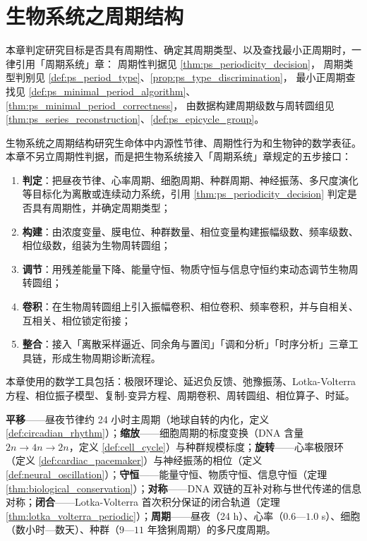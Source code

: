 \chapter{生物系统之周期结构}

\begin{remark}[本章目标的周期性判定（引用）]\label{rem:bio_ps_hook}
本章判定研究目标是否具有周期性、确定其周期类型、以及查找最小正周期时，一律引用「周期系统」章：
周期性判据见 \cref{thm:ps_periodicity_decision}，
周期类型判别见 \cref{def:ps_period_type}、\cref{prop:ps_type_discrimination}，
最小正周期查找见 \cref{def:ps_minimal_period_algorithm}、\cref{thm:ps_minimal_period_correctness}，
由数据构建周期级数与周转圆组见 \cref{thm:ps_series_reconstruction}、\cref{def:ps_epicycle_group}。
\end{remark}

\begin{remark}\label{rem:bio_five_steps_positioning}
生物系统之周期结构研究生命体中内源性节律、周期性行为和生物钟的数学表征。本章不另立周期性判据，而是把生物系统接入「周期系统」章规定的五步接口：
\begin{enumerate}[label=(\arabic*)]
    \item \textbf{判定}：把昼夜节律、心率周期、细胞周期、种群周期、神经振荡、多尺度演化等目标化为离散或连续动力系统，引用 \cref{thm:ps_periodicity_decision} 判定是否具有周期性，并确定周期类型；
    \item \textbf{构建}：由浓度变量、膜电位、种群数量、相位变量构建振幅级数、频率级数、相位级数，组装为生物周转圆组；
    \item \textbf{调节}：用残差能量下降、能量守恒、物质守恒与信息守恒约束动态调节生物周转圆组；
    \item \textbf{卷积}：在生物周转圆组上引入振幅卷积、相位卷积、频率卷积，并与自相关、互相关、相位锁定衔接；
    \item \textbf{整合}：接入「离散采样逼近、同余角与置闰」「调和分析」「时序分析」三章工具链，形成生物周期诊断流程。
\end{enumerate}
本章使用的数学工具包括：极限环理论、延迟负反馈、弛豫振荡、Lotka-Volterra 方程、相位振子模型、复制-变异方程、周期卷积、周转圆组、相位算子、时延。
\end{remark}

\begin{remark}[本章七主题导引]\label{rem:bio_seven_themes}
\textbf{平移}——昼夜节律约 24 小时主周期（地球自转的内化，定义 \ref{def:circadian_rhythm}）；\textbf{缩放}——细胞周期的标度变换（DNA 含量 $2n \to 4n \to 2n$，定义 \ref{def:cell_cycle}）与种群规模标度；\textbf{旋转}——心率极限环（定义 \ref{def:cardiac_pacemaker}）与神经振荡的相位（定义 \ref{def:neural_oscillation}）；\textbf{守恒}——能量守恒、物质守恒、信息守恒（定理 \ref{thm:biological_conservation}）；\textbf{对称}——DNA 双链的互补对称与世代传递的信息对称；\textbf{闭合}——Lotka-Volterra 首次积分保证的闭合轨道（定理 \ref{thm:lotka_volterra_periodic}）；\textbf{周期}——昼夜（24 h）、心率（$0.6$—$1.0$ s）、细胞（数小时—数天）、种群（$9$—$11$ 年猞猁周期）的多尺度周期。
\end{remark}

